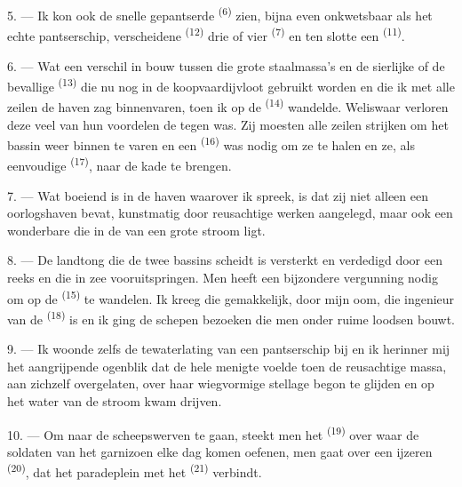 5. --- Ik kon ook de snelle gepantserde  \textsuperscript{(6)} zien, bijna
even onkwetsbaar als het echte pantserschip, verscheidene
 \textsuperscript{(12)} drie of vier
 \textsuperscript{(7)} en ten slotte een
 \textsuperscript{(11)}. 

6. --- Wat een verschil in bouw tussen die grote staalmassa's en de sierlijke
 of de bevallige 
\textsuperscript{(13)} die nu nog in de koopvaardijvloot gebruikt worden en die ik met alle
zeilen de haven zag binnenvaren, toen ik op de  \textsuperscript{(14)} wandelde.
Weliswaar verloren deze veel van hun voordelen
 de  tegen was. Zij moesten alle zeilen strijken om
het bassin weer binnen te varen en een  \textsuperscript{(16)} was nodig om
ze te halen en ze, als eenvoudige
 \textsuperscript{(17)}, naar de kade te brengen.

\VUsaut{3.0mm}
\VUsaut{3.0mm}

7. --- Wat boeiend is in de haven waarover ik spreek, is dat zij niet alleen een oorlogshaven
bevat, kunstmatig door reusachtige werken aangelegd, maar ook een wonderbare
 die in de  van een grote stroom ligt.

8. --- De landtong die de twee bassins scheidt is versterkt en verdedigd door een reeks
 en  die in zee vooruitspringen. Men heeft een bijzondere
vergunning nodig om op de  \textsuperscript{(15)} te wandelen. Ik kreeg die
gemakkelijk, door mijn oom, die ingenieur van de  \textsuperscript{(18)}
is en ik ging de schepen bezoeken die men onder ruime loodsen bouwt.

9. --- Ik woonde zelfs de tewaterlating van een pantserschip bij en ik herinner mij het
aangrijpende ogenblik dat de hele menigte voelde toen de reusachtige massa, aan zichzelf
overgelaten, over haar wiegvormige stellage begon te glijden en op het water van de stroom
kwam drijven.

10. --- Om naar de scheepswerven te gaan, steekt men het
 \textsuperscript{(19)} over waar de soldaten van het
garnizoen elke dag komen oefenen, men gaat over een ijzeren 
\textsuperscript{(20)}, dat het paradeplein met het  \textsuperscript{(21)}
verbindt.

